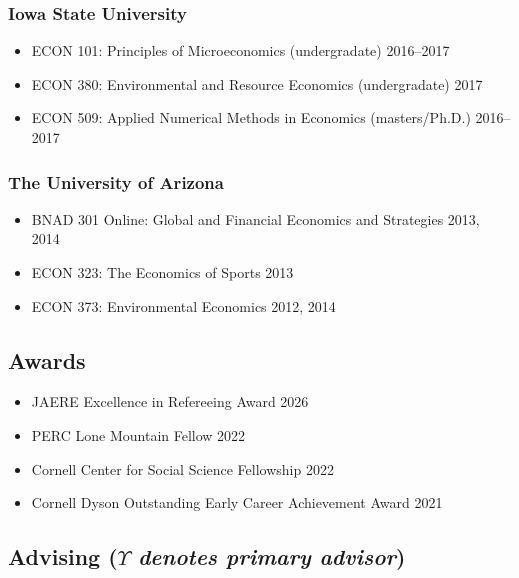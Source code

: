 \documentclass[11pt]{res} %
\begin{document}
\begin{resume}
\subsubsection{Iowa State University}
\begin{itemize} \itemsep -1pt
	\item[] ECON 101: Principles of Microeconomics (undergradate) \hfill 2016--2017
	\item[] ECON 380: Environmental and Resource Economics (undergradate) \hfill 2017
	\item[] ECON 509: Applied Numerical Methods in Economics (masters/Ph.D.) \hfill 2016--2017
\end{itemize}\vspace{-.3in}
\subsubsection{The University of Arizona}
\begin{itemize} \itemsep -1pt %
	\item[] BNAD 301 Online: Global and Financial Economics and Strategies \hfill 2013, 2014
	\item[] ECON 323: The Economics of Sports \hfill 2013
	\item[] ECON 373: Environmental Economics \hfill 2012, 2014
\end{itemize}

\vspace{-.2in}

\subsection{Awards}
\begin{itemize} \itemsep -1pt
	\item[] JAERE Excellence in Refereeing Award \hfill 2026
	\item[] PERC Lone Mountain Fellow \hfill 2022
	\item[] Cornell Center for Social Science Fellowship \hfill 2022
	\item[] Cornell Dyson Outstanding Early Career Achievement Award \hfill 2021
\end{itemize}

\vspace{-.2in}

\subsection{Advising ($\Upsilon$ \textit{denotes primary advisor})  }
\vspace{-.2in}
 

\end{resume}
\end{document}
